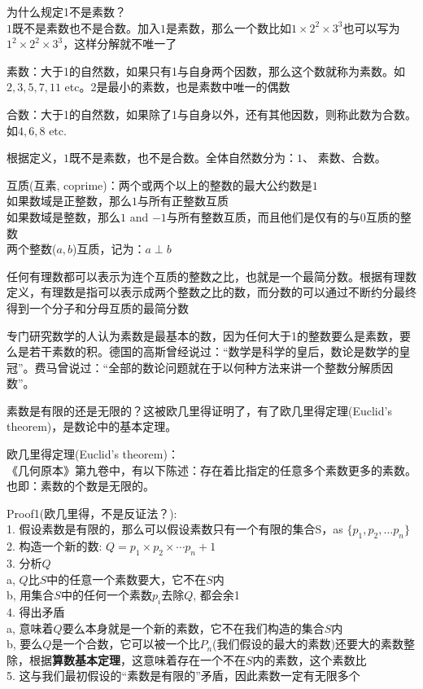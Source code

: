 \documentclass[../main.tex]{subfiles}
\begin{document}
为什么规定1不是素数？\\
$1$既不是素数也不是合数。加入$1$是素数，那么一个数比如$1\times 2^2 \times 3^3$也可以写为$1^2\times 2^2 \times 3^3$，这样分解就不唯一了

素数：大于1的自然数，如果只有1与自身两个因数，那么这个数就称为素数。如$2, 3, 5, 7, 11$ etc。2是最小的素数，也是素数中唯一的偶数

合数：大于1的自然数，如果除了1与自身以外，还有其他因数，则称此数为合数。如$4, 6, 8$ etc.

根据定义，$1$既不是素数，也不是合数。全体自然数分为：$1$、 素数、合数。

互质(互素, coprime)：两个或两个以上的整数的最大公约数是$1$\\
如果数域是正整数，那么$1$与所有正整数互质\\
如果数域是整数，那么$1$ and $-1$与所有整数互质，而且他们是仅有的与$0$互质的整数\\
两个整数($a,b$)互质，记为：$a \perp b$

任何有理数都可以表示为连个互质的整数之比，也就是一个最简分数。根据有理数定义，有理数是指可以表示成两个整数之比的数，而分数的可以通过不断约分最终得到一个分子和分母互质的最简分数

专门研究数学的人认为素数是最基本的数，因为任何大于1的整数要么是素数，要么是若干素数的积。德国的高斯曾经说过：“数学是科学的皇后，数论是数学的皇冠”。费马曾说过：“全部的数论问题就在于以何种方法来讲一个整数分解质因数”。

素数是有限的还是无限的？这被欧几里得证明了，有了欧几里得定理(Euclid's theorem)，是数论中的基本定理。

欧几里得定理(Euclid's theorem)：\\
《几何原本》第九卷中，有以下陈述：存在着比指定的任意多个素数更多的素数。也即：素数的个数是无限的。

Proof1(欧几里得，不是反证法？):\\
1. 假设素数是有限的，那么可以假设素数只有一个有限的集合S，as $\{p_1, p_2, \ldots p_n\}$\\
2. 构造一个新的数: $Q=p_1\times p_2\times \cdots p_n+1$\\
3. 分析$Q$\\
\forceindent a, $Q$比$S$中的任意一个素数要大，它不在$S$内\\
\forceindent b, 用集合$S$中的任何一个素数$p_i$去除$Q$, 都会余1\\
4. 得出矛盾\\
\forceindent a, 意味着$Q$要么本身就是一个新的素数，它不在我们构造的集合$S$内\\
\forceindent b, 要么$Q$是一个合数，它可以被一个比$P_n$(我们假设的最大的素数)还要大的素数整除，根据\textbf{算数基本定理}，这意味着存在一个不在$S$内的素数，这个素数比\\
5. 这与我们最初假设的“素数是有限的”矛盾，因此素数一定有无限多个
\end{document}
